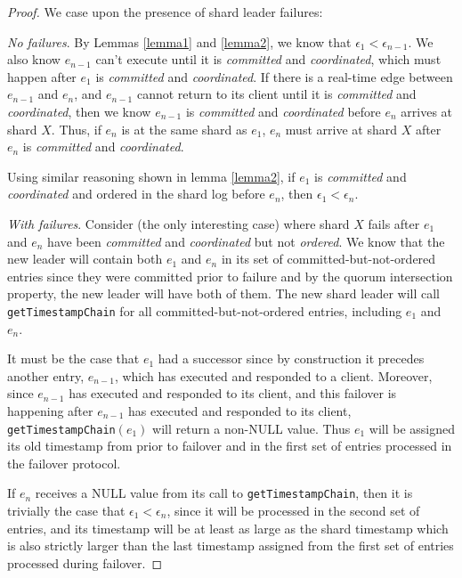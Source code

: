 \begin{proof}
We case upon the presence of shard leader failures:

 \textit{No failures}.
By Lemmas \ref{lemma1} and \ref{lemma2}, we know that $\epsilon_1 < \epsilon_{n-1}$. We also know $e_{n-1}$ can't execute until it is \textit{committed} and \textit{coordinated}, which must happen after $e_1$ is \textit{committed} and \textit{coordinated}. If there is a real-time edge between $e_{n-1}$ and $e_n$, and $e_{n-1}$ cannot return to its client until it is \textit{committed} and \textit{coordinated}, then we know $e_{n-1}$ is \textit{committed} and \textit{coordinated} before $e_n$ arrives at shard $X$. Thus, if $e_n$ is at the same shard as $e_1$, $e_n$ must arrive at shard $X$ after $e_n$ is \textit{committed} and \textit{coordinated}.

Using similar reasoning shown in lemma \ref{lemma2}, if $e_1$ is \textit{committed} and \textit{coordinated} and ordered in the shard log before $e_n$, then $\epsilon_1 < \epsilon_n$.

 \textit{With failures}.
Consider (the only interesting case) where shard $X$ fails after $e_1$ and $e_n$ have been \textit{committed} and \textit{coordinated} but not \textit{ordered}. We know that the new leader will contain both $e_1$ and $e_n$ in its set of committed-but-not-ordered entries since they were committed prior to failure and by the quorum intersection property, the new leader will have both of them. The new shard leader will call \texttt{getTimestampChain} for all committed-but-not-ordered entries, including $e_1$ and $e_n$.

It must be the case that $e_1$ had a successor since by construction it precedes another entry, $e_{n-1}$, which has executed and responded to a client. Moreover, since $e_{n-1}$ has executed and responded to its client, and this failover is happening after $e_{n-1}$ has executed and responded to its client, \texttt{getTimestampChain}$(e_1)$ will return a non-NULL value. Thus $e_1$ will be assigned its old timestamp from prior to failover and in the first set of entries processed in the failover protocol.

If $e_n$ receives a NULL value from its call to \texttt{getTimestampChain}, then it is trivially the case that $\epsilon_1 < \epsilon_n$, since it will be processed in the second set of entries, and its timestamp will be at least as large as the shard timestamp which is also strictly larger than the last timestamp assigned from the first set of entries processed during failover.


\end{proof}
